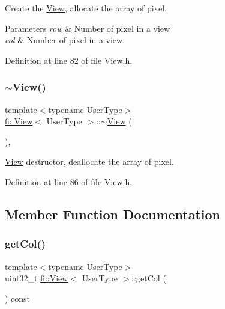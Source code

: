 Create the \hyperlink{classfi_1_1View}{View}, allocate the array of pixel. 


\begin{DoxyParams}{Parameters}
{\em row} & Number of pixel in a view \\
\hline
{\em col} & Number of pixel in a view \\
\hline
\end{DoxyParams}


Definition at line 82 of file View.\+h.

\mbox{\label{classfi_1_1View_aa560ab63a88319b516b974793186fab6}} 
\subsubsection{\texorpdfstring{$\sim$\+View()}{~View()}}
{\footnotesize\ttfamily template$<$typename User\+Type$>$ \\
\hyperlink{classfi_1_1View}{fi\+::\+View}$<$ User\+Type $>$\+::$\sim$\hyperlink{classfi_1_1View}{View} (\begin{DoxyParamCaption}{ }\end{DoxyParamCaption})\hspace{0.3cm}{\ttfamily [inline]}, {\ttfamily [override]}}



\hyperlink{classfi_1_1View}{View} destructor, deallocate the array of pixel. 



Definition at line 86 of file View.\+h.



\subsection{Member Function Documentation}
\mbox{\label{classfi_1_1View_a40f94b02c882acb3be8623781b912cb2}} 
\subsubsection{\texorpdfstring{get\+Col()}{getCol()}}
{\footnotesize\ttfamily template$<$typename User\+Type$>$ \\
uint32\+\_\+t \hyperlink{classfi_1_1View}{fi\+::\+View}$<$ User\+Type $>$\+::get\+Col (\begin{DoxyParamCaption}{ }\end{DoxyParamCaption}) const\hspace{0.3cm}{\ttfamily [inline]}}



